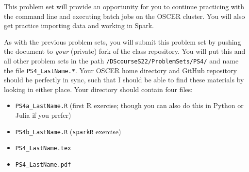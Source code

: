 \documentclass[12pt,english]{exam}
\begin{document}
This problem set will provide an opportunity for you to continue practicing with the command line and executing batch jobs on the OSCER cluster. You will also get practice importing data and working in Spark. 

As with the previous problem sets, you will submit this problem set by pushing the document to \emph{your} (private) fork of the class repository. You will put this and all other problem sets in the path \texttt{/DScourseS22/ProblemSets/PS4/} and name the file \texttt{PS4\_LastName.*}. Your OSCER home directory and GitHub repository should be perfectly in sync, such that I should be able to find these materials by looking in either place. Your directory should contain four files:
\begin{itemize}
    \item \texttt{PS4a\_LastName.R} (first R exercise; though you can also do this in Python or Julia if you prefer)
    \item \texttt{PS4b\_LastName.R} (\texttt{sparkR} exercise)
    \item \texttt{PS4\_LastName.tex}
    \item \texttt{PS4\_LastName.pdf}
\end{itemize}
\end{document}
